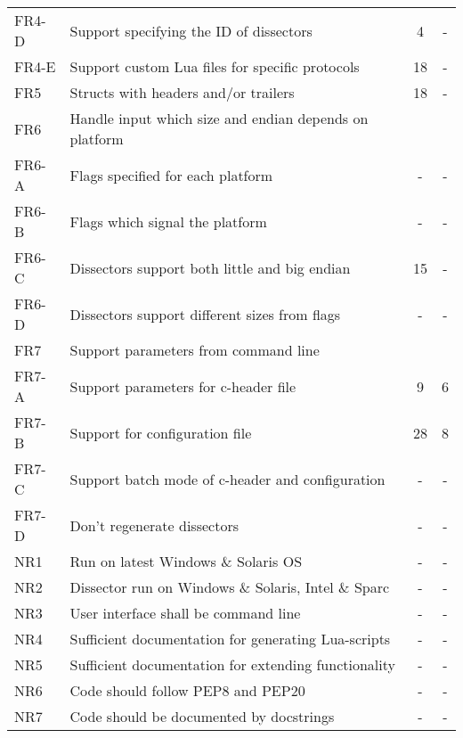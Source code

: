 \begin{table}[ht]
\begin{tabularx}{\textwidth}{l X c c}
	FR4-D & Support specifying the ID of dissectors & 4 & - \\
	FR4-E & Support custom Lua files for specific protocols & 18 & - \\
	\addlinespace
	FR5 & Structs with headers and/or trailers & 18 & - \\
	\addlinespace
	FR6 & Handle input which size and endian depends on platform & & \\
	FR6-A & Flags specified for each platform & - & - \\
	FR6-B & Flags which signal the platform & - & - \\
	FR6-C & Dissectors support both little and big endian & 15 & - \\
	FR6-D & Dissectors support different sizes from flags & - & - \\	
	\addlinespace
	FR7 & Support parameters from command line & & \\
	FR7-A & Support parameters for c-header file & 9 & 6 \\
	FR7-B & Support for configuration file & 28 & 8 \\
	FR7-C & Support batch mode of c-header and configuration & - & - \\
	FR7-D & Don't regenerate dissectors & - & - \\
	\addlinespace
	NR1 & Run on latest Windows \& Solaris OS & - & - \\
	NR2 & Dissector run on Windows \& Solaris, Intel \& Sparc & - & - \\
	NR3 & User interface shall be command line & - & - \\
	NR4 & Sufficient documentation for generating Lua-scripts & - & - \\
	NR5 & Sufficient documentation for extending functionality & - & - \\
	NR6 & Code should follow PEP8 and PEP20 & - & - \\
	NR7 & Code should be documented by docstrings & - & - \\
	\bottomrule
\end{tabularx}
\end{table}

